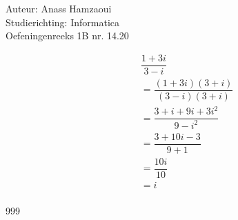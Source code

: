 \documentclass[a4paper]{article}
\begin{document}
  
\noindent \large Auteur: Anass Hamzaoui \\
\noindent \large Studierichting: Informatica \\
\noindent \large Oefeningenreeks 1B nr. 14.20 \\

\medskip

\normalsize

\begin{eqnarray*}
    && \dfrac{1 + 3i}{3 - i} \\
    && = \dfrac{(1 + 3i)(3 + i)}{(3 - i)(3 + i)} \\
    && = \dfrac{3 + i + 9i + 3i^2}{9 - i^2} \\
    && = \dfrac{3 + 10i - 3}{9 + 1} \\
    && = \dfrac{10i}{10} \\
    && = i \\
\end{eqnarray*}

\begin{thebibliography}{999}
\end{thebibliography}
\end{document}
